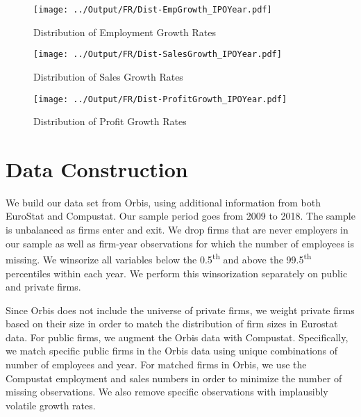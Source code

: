 \documentclass[12pt,notitlepage]{article}
\begin{document}
\begin{figure}[!htpb]
\centering
\caption{Distribution of Employment Growth Rates}
 \texttt{[image: ../Output/FR/Dist-EmpGrowth\_IPOYear.pdf]}
\end{figure}


\begin{figure}[!htpb]
\centering
\caption{Distribution of Sales Growth Rates}
 \texttt{[image: ../Output/FR/Dist-SalesGrowth\_IPOYear.pdf]}
\end{figure}



\begin{figure}[!htpb]
\centering
\caption{Distribution of Profit Growth Rates}
 \texttt{[image: ../Output/FR/Dist-ProfitGrowth\_IPOYear.pdf]}
\end{figure}








\FloatBarrier
\section{Data Construction} %
\label{sec:Data_Construction}
\FloatBarrier

We build our data set from Orbis, using additional information from both EuroStat and Compustat. Our sample period goes from 2009 to 2018. The sample is unbalanced as firms enter and exit. We drop firms that are never employers in our sample as well as firm-year observations for which the number of employees is missing. We winsorize all variables below the 0.5\textsuperscript{th} and above the 99.5\textsuperscript{th} percentiles within each year. We perform this winsorization separately on public and private firms.


Since Orbis does not include the universe of private firms, we weight private firms based on their size in order to match the distribution of firm sizes in Eurostat data. For public firms, we augment the Orbis data with Compustat. Specifically, we match specific public firms in the Orbis data using unique combinations of number of employees and year. For matched firms in Orbis, we use the Compustat employment and sales numbers in order to minimize the number of missing observations. We also remove specific observations with implausibly volatile growth rates.
\end{document}
